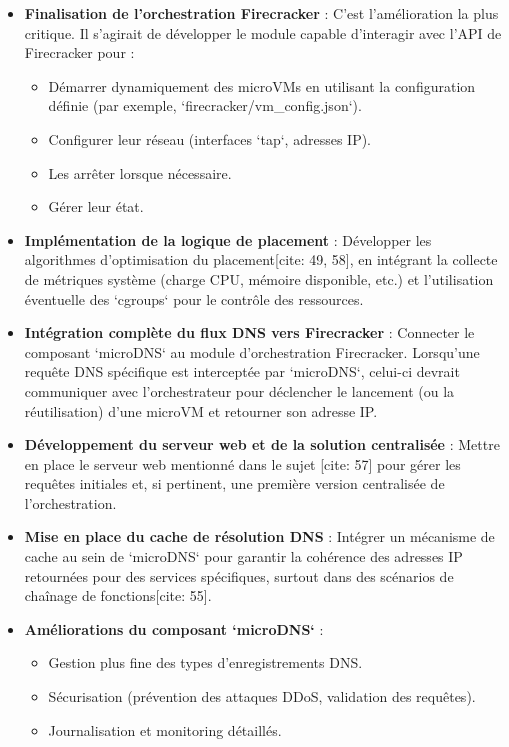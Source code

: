 \documentclass[12pt]{article}
\begin{document}
\begin{itemize}
    \item \textbf{Finalisation de l'orchestration Firecracker} : C'est l'amélioration la plus critique. Il s'agirait de développer le module capable d'interagir avec l'API de Firecracker pour :
        \begin{itemize}
            \item Démarrer dynamiquement des microVMs en utilisant la configuration définie (par exemple, `firecracker/vm_config.json`).
            \item Configurer leur réseau (interfaces `tap`, adresses IP).
            \item Les arrêter lorsque nécessaire.
            \item Gérer leur état.
        \end{itemize}
    \item \textbf{Implémentation de la logique de placement} : Développer les algorithmes d'optimisation du placement[cite: 49, 58], en intégrant la collecte de métriques système (charge CPU, mémoire disponible, etc.) et l'utilisation éventuelle des `cgroups` pour le contrôle des ressources.
    \item \textbf{Intégration complète du flux DNS vers Firecracker} : Connecter le composant `microDNS` au module d'orchestration Firecracker. Lorsqu'une requête DNS spécifique est interceptée par `microDNS`, celui-ci devrait communiquer avec l'orchestrateur pour déclencher le lancement (ou la réutilisation) d'une microVM et retourner son adresse IP.
    \item \textbf{Développement du serveur web et de la solution centralisée} : Mettre en place le serveur web mentionné dans le sujet [cite: 57] pour gérer les requêtes initiales et, si pertinent, une première version centralisée de l'orchestration.
    \item \textbf{Mise en place du cache de résolution DNS} : Intégrer un mécanisme de cache au sein de `microDNS` pour garantir la cohérence des adresses IP retournées pour des services spécifiques, surtout dans des scénarios de chaînage de fonctions[cite: 55].
    \item \textbf{Améliorations du composant `microDNS`} :
        \begin{itemize}
            \item Gestion plus fine des types d'enregistrements DNS.
            \item Sécurisation (prévention des attaques DDoS, validation des requêtes).
            \item Journalisation et monitoring détaillés.

\end{itemize}
\end{itemize}
\end{document}
